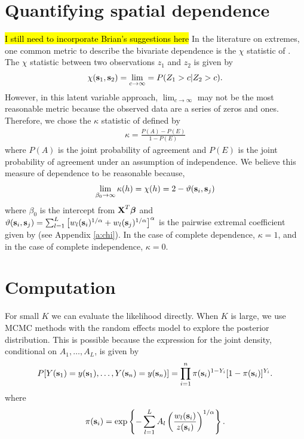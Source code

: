 \documentclass[11pt]{article}
\begin{document}
\section{Quantifying spatial dependence}
\hl{I still need to incorporate Brian's suggestions here}
In the literature on extremes, one common metric to describe the bivariate dependence is the $\chi$ statistic of \citet{Coles1999}.
The $\chi$ statistic between two observations $z_1$ and $z_2$ is given by
\begin{align}
  \chi(\mbox{\bf s}_1, \mbox{\bf s}_2) = \lim_{c \rightarrow \infty} = P(Z_1 > c | Z_2 > c).
\end{align}
However, in this latent variable approach, $\lim_{c \rightarrow \infty}$ may not be the most reasonable metric because the observed data are a series of zeros and ones.
Therefore, we chose the $\kappa$ statistic of \citet{Cohen1960} defined by
\begin{align}
  \kappa = \frac{P(A) - P(E)}{1 - P(E)}
\end{align}
where $P(A)$ is the joint probability of agreement and $P(E)$ is the joint probability of agreement under an assumption of independence.
We believe this measure of dependence to be reasonable because,
\begin{align}
  \lim_{\beta_0 \rightarrow \infty} \kappa(h) = \chi(h) = 2 - \vartheta(\mbox{\bf s}_i, \mbox{\bf s}_j)
\end{align}
where $\beta_0$ is the intercept from $\mbox{\bf X}^T\mbox{\boldmath $\beta$}$ and $\vartheta (\mbox{\bf s}_i, \mbox{\bf s}_j) = \sum_{ l = 1 }^{ L } \left[ w_{l}(\mbox{\bf s}_i)^{ 1/\alpha } +  w_{ l}(\mbox{\bf s}_j)^{ 1/\alpha } \right]^\alpha$ is the pairwise extremal coefficient given by \citet{Reich2012} (see Appendix \ref{a:chi}).
In the case of complete dependence, $\kappa = 1$, and in the case of complete independence, $\kappa = 0$.

\section{Computation}\label{s:comp}
For small $K$ we can evaluate the likelihood directly.
When $K$ is large, we use MCMC methods with the random effects model to explore the posterior distribution.
This is possible because the expression for the joint density, conditional on $A_1, \ldots, A_L$, is given by
\begin{align}
	P[Y(\mbox{\bf s}_1)=y(\mbox{\bf s}_1),\ldots,Y(\mbox{\bf s}_n)=y(\mbox{\bf s}_n)] = \prod_{ i = 1 }^{ n } \pi(\mbox{\bf s}_i)^{ 1 - Y_i } [1 - \pi(\mbox{\bf s}_i)]^{ Y_i }.
\end{align}
where
\begin{align}
  \pi(\mbox{\bf s}_i) = \exp \left\{ -\sum_{ l = 1 }^{L} A_l \left( \frac{ w_{l}(\mbox{\bf s}_i) }{ z(\mbox{\bf s}_i) } \right)^{ 1/\alpha} \right\}.
\end{align}
\end{document}
